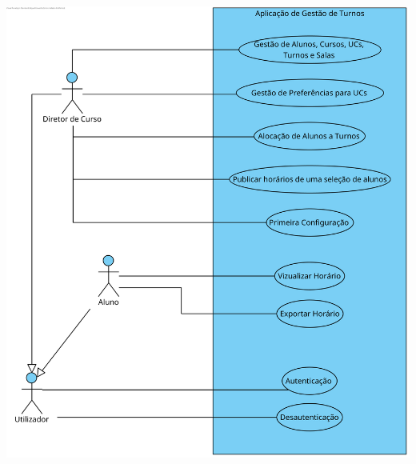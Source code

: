 \documentclass[a4paper,12pt]{scrreprt}
\begin{document}
\begin{minipage}{\textwidth}
    \centering
    \includegraphics[width=1\textwidth]{images/use-cases-diagrams/1-geral.png}
    \label{fig:2-1-diagrama_de_casos_de_uso_geral}
\end{minipage}
\end{document}
